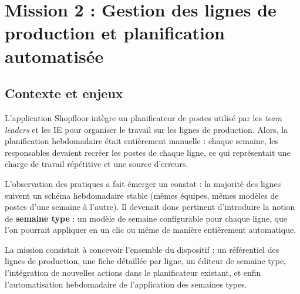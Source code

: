 \documentclass[pe1a]{tnreport} %
\begin{document}
\section{Mission 2 : Gestion des lignes de production et planification automatisée}

\subsection{Contexte et enjeux}
L'application Shopfloor intègre un planificateur de postes utilisé par les 
\textit{team leaders} et les \gls{IE} pour organiser le 
travail sur les lignes de production. Alors, la planification 
hebdomadaire était entièrement manuelle : chaque semaine, les responsables 
devaient recréer les postes de chaque ligne, ce qui représentait une charge 
de travail répétitive et une source d'erreurs.

L'observation des pratiques a fait émerger un constat : la majorité des 
lignes suivent un schéma hebdomadaire stable (mêmes équipes, mêmes 
modèles de postes d'une semaine à l'autre). Il devenait donc pertinent 
d'introduire la notion de \textbf{semaine type} : un modèle de semaine 
configurable pour chaque ligne, que l'on pourrait appliquer en un clic ou 
même de manière entièrement automatique.

La mission consistait à concevoir l'ensemble du dispositif : un référentiel 
des lignes de production, une fiche détaillée par ligne, un éditeur de 
semaine type, l'intégration de nouvelles actions dans le planificateur 
existant, et enfin l'automatisation hebdomadaire de l'application des 
semaines types.
\end{document}
